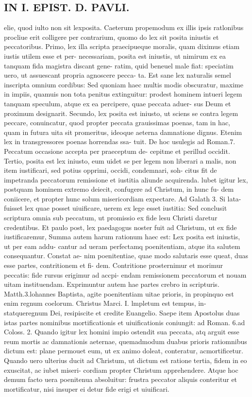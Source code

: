 \documentclass{article}
\begin{document}
\begin{pages}
\section*{IN I. EPIST. D. PAVLI. }
\marginpar{[ p.27 ]}\pstart elie, quod iulto non sit lexposita. Caeterum propemodum ex illis ipsis ratlonibus procliue erit colligere per contrarium, quomo do lex sit posita iniustis et peccatoribus. Primo, lex illa scripta praecipueque  moralis, quam diximus etiam iustis utilem esse et per- necessariam, posita est iniustis, ut nimirum ex ea tanquam fida magistra discant gene- ratim, quid beneuel male fiat: speciatim uero, ut assuescant propria agnoscere pecca- ta. Est sane lex naturalis semel inscripta omnium cordibus: Sed quoniam haec multis modis obscuratur, maxime in impiis, quamuis non tota penitus extinguitur: prodest hominem intueri legem tanquam speculum, atque  ex ea percipere, quae peccata aduer- sus Deum et proximum designarit.  \pend\pstart Secundo, lex posita est iniusto, ut sciens se contra legem peccare, conuincatur, quod propter peccata grauissimas poenas, tam in hac, quam in futura uita sit promeritus, ideoque  aeterna damnatione dignus. Etenim lex in transgressores poenas horrendas ssa- tuit. De hoc usulegis ad Roman.7. Peccatum occasione accepta per praeceptum de- cepitme et perillud occidit. Tertio, posita est lex iniusto, eum uidet se per legem non liberari a malis, non item iustificari, sed potius opprimi, occidi, condemnari, soh- citus fit de impetranda peccatorum remissione et iustitia aliunde acquirenda. lubet igitur lex, postquam hominem extremo deiecit, confugere ad Christum, in hunc fu- dem coniicere, et propter hunc solum misericordiam expectare. Ad Galath 3. Si lata- fuisset lex quae posset uiuificare, uerem ex lege esset iustitia: Sed conclusit scriptura omnia   sub peccatum, ut promissio ex fide lesu Christi daretur credentibus. Et paulo post, lex   paedagogus noster fuit ad Christum, ut ex fide iustificaremur,  \pend\pstart Summa autem harum rationum haec est: Lex posita est iniustis, ut per eam addu- cantur ad ueram perfectamq poenitentiam, atque  ita salutem consequantur. Constat ae- nim poenitentiae, quae modo salutaris esse queat, duas esse partes, contritionem et fi- dem. Contritione prosternimur et morimur peccatis: fide rursus erigimur ad accpi- endam remissionem peccatorum et nouam uitam instituendam. Exprimuntur autem hae partes crebro in scripturis. Matth.3.lohannes Baptista, agite poenitentiam uitae prioris, in propinquo est enim regnum coelorum. Christus Marci. I. lmpletum est tempus, in- statqueregnum Dei, resipiscite et credite Euangelio. Saepe item Apostolus duas istas partes nominibus mortificationis et uiuificationis coniungit: ad Roman. 6.ad Coloss. 2. Quando igitur lex homini impio ostendit sua peccata, atq arguit esse reum mortis ac damnationis aeternae, quemadmodum duabus prioris ratiomnibus dictum est: plane permouet eum, ut ex animo doleat, conteratur, acmortificetur. Quando uero ulterius ducit ad Christum, ut dictum est ratione tertia, fidem in eo exuscitat, ac iubet miseri- cordiam propter Christum apprehendere. Atque  hoc demum facto uera poenitenua absoluitur: frustra peccator aliquis conteritur et mortificatur, nisi insuper ei detur fide erigi et uiuificari. 
\end{pages}
\end{document}
